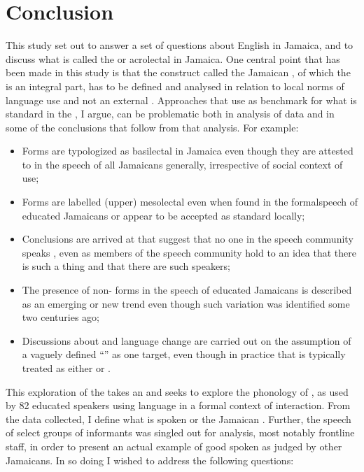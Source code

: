 \chapter{Conclusion}
This study set out to answer a set of questions about English in Jamaica, and to discuss what is called the  or acrolectal in Jamaica.  One central point that has been made in this study is that the construct called the Jamaican , of which the  is an integral part, has to be defined and analysed in relation to local norms of language use and not an external .  Approaches that use  as benchmark for what is standard in the , I argue, can be problematic both in analysis of data and in some of the conclusions that follow from that analysis.  For example:

\begin{itemize}
\item  Forms are typologized as basilectal in Jamaica even though they are attested to in the speech of all Jamaicans generally, irrespective of social context of use; 
\item Forms are labelled (upper) mesolectal even when found in the formal\linebreak speech of educated Jamaicans or appear to be accepted as standard locally;
\item Conclusions are arrived at that suggest that no one in the speech community speaks , even as members of the speech community hold to an idea that there is such a thing and that there are such speakers; 
\item The presence of non- forms in the speech of educated Jamaicans is described as an emerging or new trend even though such variation was identified some two centuries ago; 
\item Discussions about  and language change are carried out on the assumption of a vaguely defined “” as one target, even though in practice that  is typically treated as either  or .
\end{itemize}

This exploration of the  takes an  and seeks to explore the phonology of , as used by 82 educated speakers using language in a formal context of interaction.  From the data collected, I define what is spoken  or the Jamaican .  Further, the speech of select groups of informants was singled out for analysis, most notably frontline  staff, in order to present an actual example of good spoken  as judged by other Jamaicans.  In so doing I wished to address the following questions:

